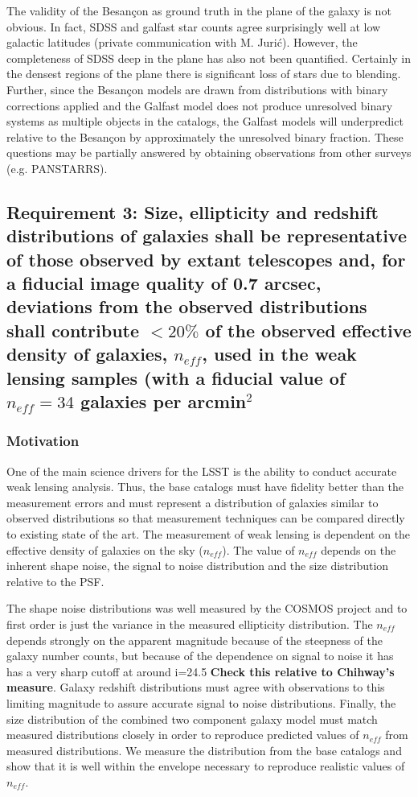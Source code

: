 \documentclass[]{article}
\begin{document}
The validity of the Besan\c{c}on as ground truth in the plane of the galaxy is not obvious.  In fact, SDSS and galfast star counts agree surprisingly well at low galactic latitudes (private communication with M. Juri\'{c}). 
However, the completeness of SDSS deep in the plane has also not been quantified.  Certainly in the densest regions
of the plane there is significant loss of stars due to blending.  Further, since the Besan\c{c}on models are drawn
from distributions with binary corrections applied and the Galfast model does not produce unresolved binary systems
as multiple objects in the catalogs, the Galfast models will underpredict relative to the Besan\c{c}on by 
approximately the unresolved binary fraction.  These questions may be partially answered by obtaining observations
from other surveys (e.g. PANSTARRS).

\subsection{Requirement 3: Size, ellipticity and redshift distributions of galaxies shall be representative of those observed by extant
telescopes and, for a fiducial image quality of 0.7 arcsec, deviations from the observed distributions shall
contribute $< 20\%$ of the observed effective density of galaxies, $n_{eff}$, used in the weak lensing samples (with a fiducial value of
$n_{eff} = 34$ galaxies per arcmin$^2$}
\subsubsection{Motivation}
One of the main science drivers for the LSST is the ability to conduct accurate weak lensing analysis.  Thus, the base catalogs must 
have fidelity better than the measurement errors and must represent a distribution of galaxies similar to observed distributions
so that measurement techniques can be compared directly to existing state of the art.  The measurement of weak lensing is dependent 
on the effective density of galaxies on the sky ($n_{eff}$).  The value of $n_{eff}$ depends on the inherent shape noise, the signal to noise distribution and the size distribution relative to the PSF.

The shape noise distributions was well measured by the COSMOS project and to first order is just the variance in the measured 
ellipticity distribution.  The $n_{eff}$ depends strongly on the apparent magnitude because of the steepness of the galaxy number
counts, but because of the dependence on signal to noise it has
has a very sharp cutoff at around i=24.5 {\bf Check this relative to Chihway's measure}.  Galaxy redshift distributions must
agree with observations to this limiting magnitude to assure accurate signal to noise distributions.  Finally, the size distribution
of the combined two component galaxy model must match measured distributions closely in order to reproduce predicted
values of $n_{eff}$ from measured distributions.  We measure the distribution from the base catalogs and show that it is well
within the envelope necessary to reproduce realistic values of $n_{eff}$.
\end{document}
